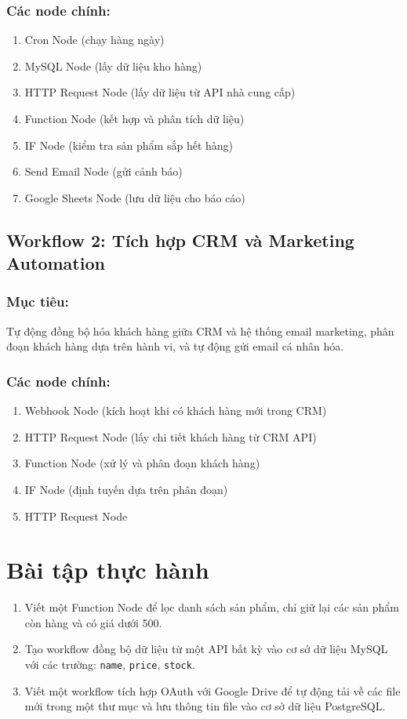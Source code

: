 \subsubsection{Các node chính:}
\begin{enumerate}
    \item Cron Node (chạy hàng ngày)
    \item MySQL Node (lấy dữ liệu kho hàng)
    \item HTTP Request Node (lấy dữ liệu từ API nhà cung cấp)
    \item Function Node (kết hợp và phân tích dữ liệu)
    \item IF Node (kiểm tra sản phẩm sắp hết hàng)
    \item Send Email Node (gửi cảnh báo)
    \item Google Sheets Node (lưu dữ liệu cho báo cáo)
\end{enumerate}

\subsection{Workflow 2: Tích hợp CRM và Marketing Automation}

\subsubsection{Mục tiêu:} Tự động đồng bộ hóa khách hàng giữa CRM và hệ thống email marketing, phân đoạn khách hàng dựa trên hành vi, và tự động gửi email cá nhân hóa.

\subsubsection{Các node chính:}
\begin{enumerate}
    \item Webhook Node (kích hoạt khi có khách hàng mới trong CRM)
    \item HTTP Request Node (lấy chi tiết khách hàng từ CRM API)
    \item Function Node (xử lý và phân đoạn khách hàng)
    \item IF Node (định tuyến dựa trên phân đoạn)
    \item HTTP Request Node 
\end{enumerate}

\section{Bài tập thực hành}

\begin{enumerate} 
    \item Viết một Function Node để lọc danh sách sản phẩm, chỉ giữ lại các sản phẩm còn hàng và có giá dưới 500. 
    \item Tạo workflow đồng bộ dữ liệu từ một API bất kỳ vào cơ sở dữ liệu MySQL với các trường: \texttt{name}, \texttt{price}, \texttt{stock}. \item Viết một workflow tích hợp OAuth với Google Drive để tự động tải về các file mới trong một thư mục và lưu thông tin file vào cơ sở dữ liệu PostgreSQL. 
\end{enumerate}

